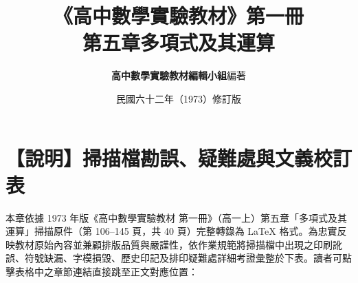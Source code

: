 \documentclass[a4paper,12pt,twoside]{article}
\title{\LARGE\textbf{《高中數學實驗教材》第一冊}\\[0.5em] \Large\textbf{第五章\quad 多項式及其運算}}
\author{\textbf{高中數學實驗教材編輯小組}\quad 編著}
\date{民國六十二年（1973）修訂版}
\begin{document}
\maketitle
\thispagestyle{firstpage}

\section*{【說明】掃描檔勘誤、疑難處與文義校訂表}
\label{sec:master_errata_notes}

本章依據 1973 年版《高中數學實驗教材 第一冊》（高一上）第五章「多項式及其運算」掃描原件（第 106--145 頁，共 40 頁）完整轉錄為 \LaTeX{} 格式。為忠實反映教材原始內容並兼顧排版品質與嚴謹性，依作業規範將掃描檔中出現之印刷訛誤、符號缺漏、字模損毀、歷史印記及排印疑難處詳細考證彙整於下表。讀者可點擊表格中之章節連結直接跳至正文對應位置：
\end{document}
